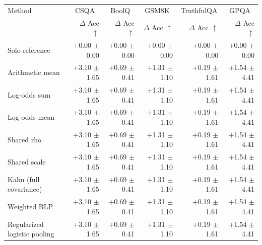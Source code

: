 \begin{tabular}{lrrrrr}
\toprule
Method & \multicolumn{1}{c}{CSQA} & \multicolumn{1}{c}{BoolQ} & \multicolumn{1}{c}{GSM8K} & \multicolumn{1}{c}{TruthfulQA} & \multicolumn{1}{c}{GPQA} \\
 & $\Delta$ Acc $\uparrow$ & $\Delta$ Acc $\uparrow$ & $\Delta$ Acc $\uparrow$ & $\Delta$ Acc $\uparrow$ & $\Delta$ Acc $\uparrow$ \\
\midrule
Solo reference & +0.00 {\scriptsize $\pm$ 0.00} & +0.00 {\scriptsize $\pm$ 0.00} & +0.00 {\scriptsize $\pm$ 0.00} & +0.00 {\scriptsize $\pm$ 0.00} & +0.00 {\scriptsize $\pm$ 0.00} \\
Arithmetic mean & +3.10 {\scriptsize $\pm$ 1.65} & +0.69 {\scriptsize $\pm$ 0.41} & +1.31 {\scriptsize $\pm$ 1.10} & +0.19 {\scriptsize $\pm$ 1.61} & +1.54 {\scriptsize $\pm$ 4.41} \\
Log-odds sum & +3.10 {\scriptsize $\pm$ 1.65} & +0.69 {\scriptsize $\pm$ 0.41} & +1.31 {\scriptsize $\pm$ 1.10} & +0.19 {\scriptsize $\pm$ 1.61} & +1.54 {\scriptsize $\pm$ 4.41} \\
Log-odds mean & +3.10 {\scriptsize $\pm$ 1.65} & +0.69 {\scriptsize $\pm$ 0.41} & +1.31 {\scriptsize $\pm$ 1.10} & +0.19 {\scriptsize $\pm$ 1.61} & +1.54 {\scriptsize $\pm$ 4.41} \\
Shared rho & +3.10 {\scriptsize $\pm$ 1.65} & +0.69 {\scriptsize $\pm$ 0.41} & +1.31 {\scriptsize $\pm$ 1.10} & +0.19 {\scriptsize $\pm$ 1.61} & +1.54 {\scriptsize $\pm$ 4.41} \\
Shared scale & +3.10 {\scriptsize $\pm$ 1.65} & +0.69 {\scriptsize $\pm$ 0.41} & +1.31 {\scriptsize $\pm$ 1.10} & +0.19 {\scriptsize $\pm$ 1.61} & +1.54 {\scriptsize $\pm$ 4.41} \\
Kahn (full covariance) & +3.10 {\scriptsize $\pm$ 1.65} & +0.69 {\scriptsize $\pm$ 0.41} & +1.31 {\scriptsize $\pm$ 1.10} & +0.19 {\scriptsize $\pm$ 1.61} & +1.54 {\scriptsize $\pm$ 4.41} \\
Weighted BLP & +3.10 {\scriptsize $\pm$ 1.65} & +0.69 {\scriptsize $\pm$ 0.41} & +1.31 {\scriptsize $\pm$ 1.10} & +0.19 {\scriptsize $\pm$ 1.61} & +1.54 {\scriptsize $\pm$ 4.41} \\
Regularized logistic pooling & +3.10 {\scriptsize $\pm$ 1.65} & +0.69 {\scriptsize $\pm$ 0.41} & +1.31 {\scriptsize $\pm$ 1.10} & +0.19 {\scriptsize $\pm$ 1.61} & +1.54 {\scriptsize $\pm$ 4.41} \\

\end{tabular}
